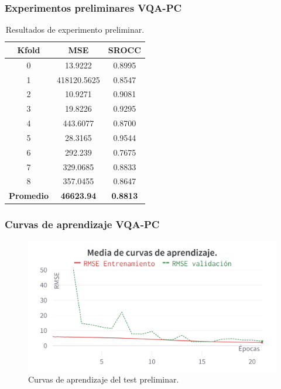 \begin{frame}
  \frametitle{Experimentos preliminares VQA-PC}
\begin{table}[htp]
  \small
  \begin{center}
    \begin{tabular}[c]{|c|c|c|}
      \hline
      \rowcolor[HTML]{FFC702}
      \textbf{Kfold} & \textbf{MSE} & \textbf{SROCC} \\ 
      \hline 
      0 & 13.9222 & 0.8995 \\
      \hline 
      1 & 418120.5625 & 0.8547 \\ 
      \hline 
      2 & 10.9271 & 0.9081 \\
      \hline 
      3 & 19.8226 & 0.9295 \\ 
      \hline 
      4 & 443.6077 & 0.8700 \\ 
      \hline 
      5 & 28.3165 & 0.9544 \\ 
      \hline 
      6 & 292.239 & 0.7675 \\ 
      \hline 
      7 & 329.0685 & 0.8833 \\ 
      \hline 
      8 & 357.0455 & 0.8647 \\ 
      \hline
      \textbf{\cellcolor[HTML]{FFC702}Promedio} & \textbf{46623.94} & \textbf{0.8813} \\ 
      \hline
    \end{tabular}
  \end{center}
  \caption[Resultados de experimento preliminar.]{
    Resultados de experimento preliminar. 
  }
  \label{tab:PreTestResults}
\end{table}
\end{frame}

\begin{frame}
  \frametitle{Curvas de aprendizaje VQA-PC}
  \vspace{-.2cm}
\begin{figure}[htp]
  \centering
    \includegraphics[width=.75\textwidth]{imagenes/chapter4/PreTestCurves.png}
  \caption[Curvas de aprendizaje del test preliminar.]{
    Curvas de aprendizaje del test preliminar. 
  } 
\label{fig:PreTestCurves}
\end{figure}
\end{frame}

